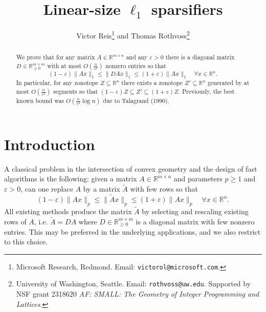 \documentclass[12pt,english]{article}
\title{Linear-size $\ell_1$ sparsifiers}
\author{Victor Reis\thanks{Microsoft Research, Redmond. Email: {\tt victorol@microsoft.com}.} \;\; and \; Thomas Rothvoss\thanks{University of Washington, Seattle. Email: {\tt rothvoss@uw.edu}. Supported by NSF grant 2318620 \emph{AF: SMALL: The Geometry of Integer Programming and Lattices}.}}
\date{}
\theoremstyle{theorem}
\theoremstyle{remark}
\providecommand{\setR}{\mathbb{R}}
\newcommand{\eps}{\varepsilon}
\begin{document}
\maketitle

\begin{abstract} 
   We prove that for any matrix $A \in \setR^{m \times n}$ and any $\eps > 0$ there is a diagonal matrix $D \in \setR_{\geq 0}^{m \times m}$ with at most $O(\frac{n}{\varepsilon^2})$
  nonzero entries so that
  \[
  (1-\varepsilon) \|Ax\|_1 \leq \|DAx\|_1 \leq (1+\varepsilon)\|Ax\|_1 \quad \forall x \in \setR^n.
  \]
  In particular, for any zonotope $Z \subseteq \setR^{n}$ there exists a zonotope $Z' \subseteq \setR^{n}$ generated by at most $O(\frac{n}{\varepsilon^2})$ segments so that $(1-\varepsilon) Z \subseteq Z' \subseteq (1+\varepsilon) Z$. Previously, the best known bound was $O(\frac{n}{\varepsilon^2} \log n)$ due to Talagrand (1990). 
\end{abstract}


\section{Introduction}

A classical problem in the intersection of convex geometry and the design of fast algorithms is the
following: given a matrix $A \in \setR^{m \times n}$ and parameters $p \geq 1$ and $\varepsilon > 0$, can one
replace $A$ by a matrix $\widetilde{A}$ with few rows so that
\begin{equation} \label{eq:LpApproximation}
 (1-\varepsilon) \|Ax\|_p \leq  \|\widetilde{A}x\|_p \leq (1+\varepsilon) \|Ax\|_p \quad \forall x \in \setR^n.
\end{equation}
All existing methods %
 produce the matrix $\widetilde{A}$ by selecting and rescaling existing rows of $A$, i.e. $\widetilde{A} = DA$ where $D \in \setR_{\geq 0}^{m \times m}$ is a diagonal matrix with few nonzero entries. This may be preferred in the underlying applications, and we also restrict to this choice.
\end{document}
